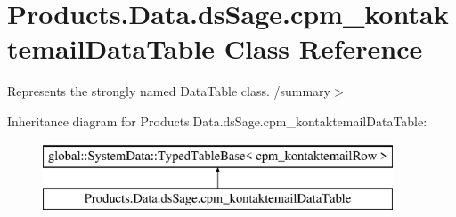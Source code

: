 \hypertarget{class_products_1_1_data_1_1ds_sage_1_1cpm__kontaktemail_data_table}{}\section{Products.\+Data.\+ds\+Sage.\+cpm\+\_\+kontaktemail\+Data\+Table Class Reference}
\label{class_products_1_1_data_1_1ds_sage_1_1cpm__kontaktemail_data_table}


Represents the strongly named Data\+Table class. /summary$>$  


Inheritance diagram for Products.\+Data.\+ds\+Sage.\+cpm\+\_\+kontaktemail\+Data\+Table\+:\begin{figure}[H]
\begin{center}
\leavevmode
\includegraphics[height=2.000000cm]{class_products_1_1_data_1_1ds_sage_1_1cpm__kontaktemail_data_table}
\end{center}
\end{figure}
